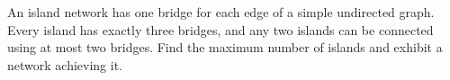 An island network has one bridge for each edge of a simple undirected graph. Every island has exactly three bridges, and any two islands can be connected using at most two bridges. Find the maximum number of islands and exhibit a network achieving it.
